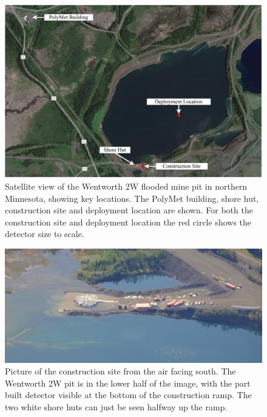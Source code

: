 \begin{figure} %
    \includegraphics[width=\textwidth]{diagrams/4-chips/pit.pdf}
    \caption[Satellite view of the Wentworth 2W mine pit, with key locations.]
    {Satellite view of the Wentworth 2W flooded mine pit in northern Minnesota, showing key
        \chipsfive locations. The PolyMet building, shore hut, construction site and deployment
        location are shown. For both the construction site and deployment location the red circle
        shows the \chipsfive detector size to scale.}
    \label{fig:pit}
\end{figure}

\begin{figure} %
    \includegraphics[width=\textwidth]{diagrams/4-chips/from_the_sky.jpg}
    \caption[Picture of the \chipsfive construction site from the air.]
    {Picture of the \chipsfive construction site from the air facing south. The Wentworth 2W pit
        is in the lower half of the image, with the part built \chipsfive detector visible at the
        bottom of the construction ramp. The two white shore huts can just be seen halfway up the
        ramp.}
    \label{fig:from_the_sky}
\end{figure}

